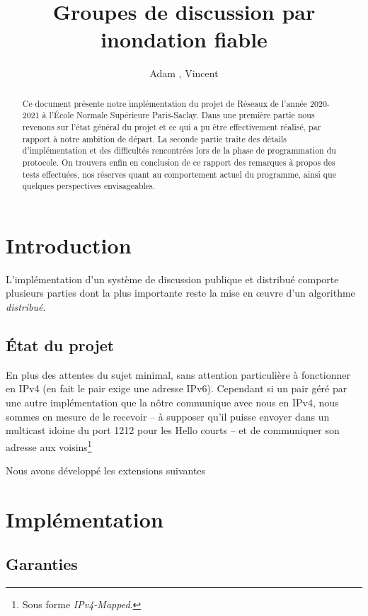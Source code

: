 \documentclass[11pt,a4paper]{article}
\title{Groupes de discussion par inondation fiable}
\author{Adam \bsc{Phillips}, Vincent \bsc{Bonczak}}
\begin{document}
  \maketitle
	
	\begin{abstract}
	Ce document présente notre implémentation du projet de Réseaux de l'année 2020-2021 à l'École Normale Supérieure Paris-Saclay. Dans une première partie
	nous revenons sur l'état général du projet et ce qui a pu être effectivement réalisé, par rapport à notre ambition de départ. La seconde partie traite 
	des détails d'implémentation et des difficultés rencontrées lors de la phase de programmation du protocole. On trouvera enfin en conclusion de ce rapport
	des remarques à propos des tests effectuées, nos réserves quant au comportement actuel du programme, ainsi que quelques perspectives envisageables.
	\end{abstract}
	
	
\section{Introduction}

L'implémentation d'un système de discussion publique et distribué comporte plusieurs parties dont la plus importante reste la mise en œuvre d'un algorithme \emph{distribué}.

\subsection{État du projet}

En plus des attentes du sujet minimal, sans attention particulière à fonctionner en IPv4 (en fait le pair exige une adresse IPv6). Cependant si un pair géré par
une autre implémentation que la nôtre communique avec nous en IPv4, nous sommes en mesure de le recevoir -- à supposer qu'il puisse envoyer dans un multicast 
idoine du port 1212 pour les Hello courts -- et de communiquer son adresse aux voisins\footnote{Sous forme \emph{IPv4-Mapped}.} 

Nous avons développé les extensions suivantes

\section{Implémentation}

\subsection{Garanties}
\end{document}
